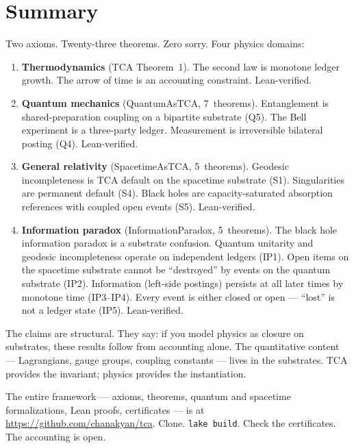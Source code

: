 \documentclass[11pt]{article}
\theoremstyle{definition}
\theoremstyle{remark}
\begin{document}
\section{Summary}

Two axioms.  Twenty-three theorems.  Zero sorry.  Four physics domains:

\begin{enumerate}[leftmargin=2em]
\item \textbf{Thermodynamics} (TCA Theorem~1).  The second law is
  monotone ledger growth.  The arrow of time is an accounting
  constraint.  Lean-verified.

\item \textbf{Quantum mechanics} (QuantumAsTCA, 7~theorems).
  Entanglement is shared-preparation coupling on a bipartite
  substrate (Q5).  The Bell experiment is a three-party ledger.
  Measurement is irreversible bilateral posting (Q4).  Lean-verified.

\item \textbf{General relativity} (SpacetimeAsTCA, 5~theorems).
  Geodesic incompleteness is TCA default on the spacetime substrate
  (S1).  Singularities are permanent default (S4).  Black holes are
  capacity-saturated absorption references with coupled open events
  (S5).  Lean-verified.

\item \textbf{Information paradox} (InformationParadox, 5~theorems).
  The black hole information paradox is a substrate confusion.
  Quantum unitarity and geodesic incompleteness operate on independent
  ledgers (IP1).  Open items on the spacetime substrate cannot be
  ``destroyed'' by events on the quantum substrate (IP2).  Information
  (left-side postings) persists at all later times by monotone time
  (IP3--IP4).  Every event is either closed or open --- ``lost'' is
  not a ledger state (IP5).  Lean-verified.
\end{enumerate}

The claims are structural.  They say: if you model physics as closure
on substrates, these results follow from accounting alone.  The
quantitative content --- Lagrangians, gauge groups, coupling
constants --- lives in the substrates.  TCA provides the invariant;
physics provides the instantiation.

The entire framework --- axioms, theorems, quantum and spacetime
formalizations, Lean proofs, certificates --- is at
\url{https://github.com/chanakyan/tca}.  Clone.  \texttt{lake build}.
Check the certificates.  The accounting is open.
\end{document}
